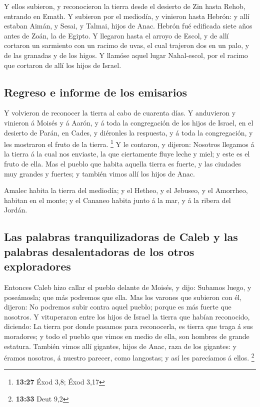  Y ellos subieron, y reconocieron la tierra desde el
desierto de Zin hasta Rehob, entrando en Emath.  Y
subieron por el mediodía, y vinieron hasta Hebrón: y allí estaban Aimán,
y Sesai, y Talmai, hijos de Anac. Hebrón fué edificada siete años antes
de Zoán, la de Egipto.  Y llegaron hasta el arroyo de
Escol, y de allí cortaron un sarmiento con un racimo de uvas, el cual
trajeron dos en un palo, y de las granadas y de los higos.
 Y llamóse aquel lugar Nahal-escol, por el racimo que
cortaron de allí los hijos de Israel.

\hypertarget{regreso-e-informe-de-los-emisarios}{%
\subsection{Regreso e informe de los
emisarios}\label{regreso-e-informe-de-los-emisarios}}

 Y volvieron de reconocer la tierra al cabo de cuarenta
días.  Y anduvieron y vinieron á Moisés y á Aarón, y á
toda la congregación de los hijos de Israel, en el desierto de Parán, en
Cades, y diéronles la respuesta, y á toda la congregación, y les
mostraron el fruto de la tierra. \footnote{\textbf{13:27} Éxod 3,8; Éxod
  3,17}  Y le contaron, y dijeron: Nosotros llegamos á la
tierra á la cual nos enviaste, la que ciertamente fluye leche y miel; y
este es el fruto de ella.  Mas el pueblo que habita
aquella tierra es fuerte, y las ciudades muy grandes y fuertes; y
también vimos allí los hijos de Anac.

 Amalec habita la tierra del mediodía; y el Hetheo, y el
Jebuseo, y el Amorrheo, habitan en el monte; y el Cananeo habita junto á
la mar, y á la ribera del Jordán.

\hypertarget{las-palabras-tranquilizadoras-de-caleb-y-las-palabras-desalentadoras-de-los-otros-exploradores}{%
\subsection{Las palabras tranquilizadoras de Caleb y las palabras
desalentadoras de los otros
exploradores}\label{las-palabras-tranquilizadoras-de-caleb-y-las-palabras-desalentadoras-de-los-otros-exploradores}}

 Entonces Caleb hizo callar el pueblo delante de Moisés,
y dijo: Subamos luego, y poseámosla; que más podremos que ella.
 Mas los varones que subieron con él, dijeron: No
podremos subir contra aquel pueblo; porque es más fuerte que nosotros.
 Y vituperaron entre los hijos de Israel la tierra que
habían reconocido, diciendo: La tierra por donde pasamos para
reconocerla, es tierra que traga á sus moradores; y todo el pueblo que
vimos en medio de ella, son hombres de grande estatura. También vimos
allí gigantes, hijos de Anac, raza de los gigantes: y éramos nosotros, á
nuestro parecer, como langostas; y así les parecíamos á ellos.
\footnote{\textbf{13:33} Deut 9,2}

